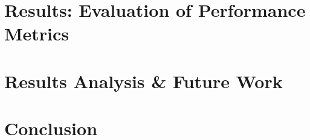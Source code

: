 \documentclass[12pt, hidelinks, draft]{article}
\begin{document}
\newpage
\section{Results: Evaluation of Performance Metrics}
\label{sec:results}


\newpage
\section{Results Analysis \& Future Work}


\newpage
\section{Conclusion}
\lipsum[1]

\newpage

\printbibliography[heading=bibintoc]
\newpage





\newpage
\end{document}
